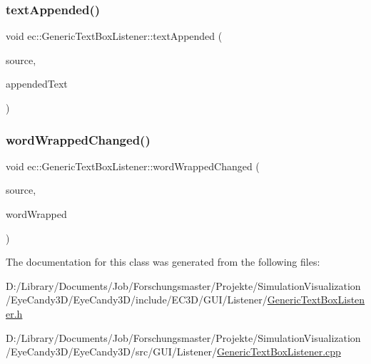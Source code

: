 \subsubsection{\texorpdfstring{text\+Appended()}{textAppended()}}
{\footnotesize\ttfamily void ec\+::\+Generic\+Text\+Box\+Listener\+::text\+Appended (\begin{DoxyParamCaption}\item[{agui\+::\+Text\+Box $\ast$}]{source,  }\item[{const std\+::string \&}]{appended\+Text }\end{DoxyParamCaption})\hspace{0.3cm}{\ttfamily [override]}}

\mbox{\label{classec_1_1_generic_text_box_listener_a96cdc8f0e3932f1cfbe2fd6888818452}} 
\subsubsection{\texorpdfstring{word\+Wrapped\+Changed()}{wordWrappedChanged()}}
{\footnotesize\ttfamily void ec\+::\+Generic\+Text\+Box\+Listener\+::word\+Wrapped\+Changed (\begin{DoxyParamCaption}\item[{agui\+::\+Text\+Box $\ast$}]{source,  }\item[{bool}]{word\+Wrapped }\end{DoxyParamCaption})\hspace{0.3cm}{\ttfamily [override]}}



The documentation for this class was generated from the following files\+:\begin{DoxyCompactItemize}
\item 
D\+:/\+Library/\+Documents/\+Job/\+Forschungsmaster/\+Projekte/\+Simulation\+Visualization/\+Eye\+Candy3\+D/\+Eye\+Candy3\+D/include/\+E\+C3\+D/\+G\+U\+I/\+Listener/\mbox{\hyperlink{_generic_text_box_listener_8h}{Generic\+Text\+Box\+Listener.\+h}}\item 
D\+:/\+Library/\+Documents/\+Job/\+Forschungsmaster/\+Projekte/\+Simulation\+Visualization/\+Eye\+Candy3\+D/\+Eye\+Candy3\+D/src/\+G\+U\+I/\+Listener/\mbox{\hyperlink{_generic_text_box_listener_8cpp}{Generic\+Text\+Box\+Listener.\+cpp}}\end{DoxyCompactItemize}
